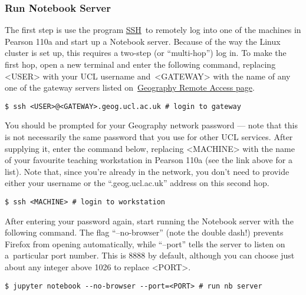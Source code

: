 \documentclass[10pt,a4]{article}
\begin{document}
\subsubsection{Run Notebook Server}

\label{702963}

The first step is use the program
\href{http://linuxcommand.org/man_pages/ssh1.html}{SSH}~to remotely log
into one of the machines in Pearson 110a and start up a Notebook server.
Because of the way the Linux cluster is set up, this requires a two-step
(or ``multi-hop'') log in. To make the first hop, open a new terminal
and enter the following command, replacing \textless{}USER\textgreater{}
with your UCL username and~\textless{}GATEWAY\textgreater{} with the
name of any one of the gateway servers listed
on~\href{http://www.geog.ucl.ac.uk/resources/computer-support/linux-remote-access}{Geography
Remote Access page}.


\lstset{language=bash}

\begin{lstlisting}
$ ssh <USER>@<GATEWAY>.geog.ucl.ac.uk # login to gateway
\end{lstlisting}

You should be prompted for your Geography network password --- note that
this is not necessarily the same password that you use for other UCL
services. After supplying it, enter the command below, replacing
\textless{}MACHINE\textgreater{} with the name of your favourite
teaching workstation in Pearson 110a (see the link above for a list).
Note that, since you're already in the network, you don't need to
provide either your username or the ``.geog.ucl.ac.uk'' address on this
second hop.


\begin{lstlisting}
$ ssh <MACHINE> # login to workstation
\end{lstlisting}

After entering your password again, start running the Notebook server
with the following command. The flag ``--no-browser'' (note the double
dash!) prevents Firefox from opening automatically, while ``--port''
tells the server to listen on a~particular port number. This is 8888 by
default, although you can choose just about any integer above 1026 to
replace \textless{}PORT\textgreater{}.


\begin{lstlisting}
$ jupyter notebook --no-browser --port=<PORT> # run nb server
\end{lstlisting}
\end{document}
